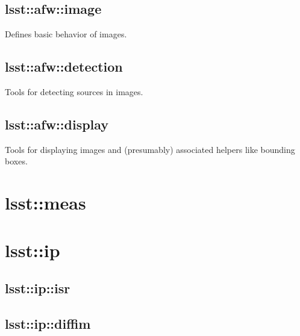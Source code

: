
\subsection{lsst::afw::image}

Defines basic behavior of images.

\subsection{lsst::afw::detection}

Tools for detecting sources in images.

\subsection{lsst::afw::display}

Tools for displaying images and (presumably) associated helpers like
bounding boxes.

\section{lsst::meas}

\section{lsst::ip}

\subsection{lsst::ip::isr}

\subsection{lsst::ip::diffim}
